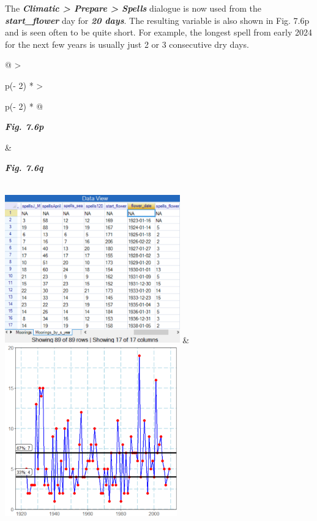 \documentclass[
  letterpaper,
  DIV=11,
  numbers=noendperiod]{scrreprt}
\begin{document}
The \textbf{\emph{Climatic \textgreater{} Prepare \textgreater{}
Spells}} dialogue is now used from the \textbf{\emph{start\_flower}} day
for \textbf{\emph{20 days}}. The resulting variable is also shown in
Fig. 7.6p and is seen often to be quite short. For example, the longest
spell from early 2024 for the next few years is usually just 2 or 3
consecutive dry days.

\begin{longtable}[]{@{}
  >{\raggedright\arraybackslash}p{(\columnwidth - 2\tabcolsep) * }
  >{\raggedright\arraybackslash}p{(\columnwidth - 2\tabcolsep) * }@{}}
\toprule\noalign{}
\begin{minipage}[b]{\linewidth}\raggedright
\textbf{\emph{Fig. 7.6p}}
\end{minipage} & \begin{minipage}[b]{\linewidth}\raggedright
\textbf{\emph{Fig. 7.6q}}
\end{minipage} \\
\midrule\noalign{}
\endhead
\bottomrule\noalign{}
\endlastfoot
\includegraphics[width=2.97498in,height=2.52035in]{figures/Fig7.6p.png}
&
\includegraphics[width=2.92717in,height=2.89352in]{figures/Fig7.6q.png} \\
\end{longtable}
\end{document}
